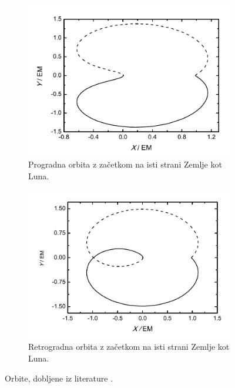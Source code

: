 \documentclass[11pt, titlepage]{article}
\begin{document}
\begin{figure}[H]
    \vspace{0.5cm}

    \begin{subfigure}[b]{0.45\textwidth}
        \centering
        \includegraphics[width=\textwidth]{figures/theory_orbit_3.png}
        \caption{Progradna orbita z začetkom na isti strani Zemlje kot Luna.}
        \label{fig:orbit_3}
    \end{subfigure}
    \hfill
    \begin{subfigure}[b]{0.45\textwidth}
        \centering
        \includegraphics[width=\textwidth]{figures/theory_orbit_4.png}
        \caption{Retrogradna orbita z začetkom na isti strani Zemlje kot Luna.}
        \label{fig:orbit_4}
    \end{subfigure}

    \caption{Orbite, dobljene iz literature \cite{XIYUN2013183}.}
    \label{fig:theory_orbits}
\end{figure}
\end{document}
